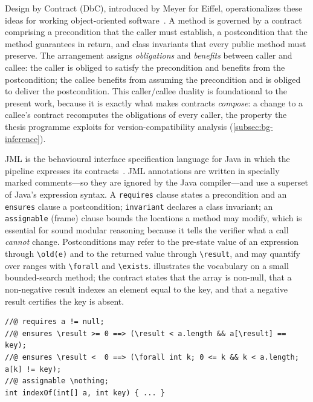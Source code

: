 Design by Contract (DbC), introduced by Meyer for Eiffel, operationalizes these ideas for working object-oriented software~\cite{meyer1992dbc,meyer1997oosc}. A method is governed by a contract comprising a precondition that the caller must establish, a postcondition that the method guarantees in return, and class invariants that every public method must preserve. The arrangement assigns \emph{obligations} and \emph{benefits} between caller and callee: the caller is obliged to satisfy the precondition and benefits from the postcondition; the callee benefits from assuming the precondition and is obliged to deliver the postcondition. This caller/callee duality is foundational to the present work, because it is exactly what makes contracts \emph{compose}: a change to a callee's contract recomputes the obligations of every caller, the property the thesis programme exploits for version-compatibility analysis (\cref{subsec:bg-inference}).

JML is the behavioural interface specification language for Java in which the pipeline expresses its contracts~\cite{leavens2006jml}. JML annotations are written in specially marked comments---so they are ignored by the Java compiler---and use a superset of Java's expression syntax. A \texttt{requires} clause states a precondition and an \texttt{ensures} clause a postcondition; \texttt{invariant} declares a class invariant; an \texttt{assignable} (frame) clause bounds the locations a method may modify, which is essential for sound modular reasoning because it tells the verifier what a call \emph{cannot} change. Postconditions may refer to the pre-state value of an expression through \verb|\old(e)| and to the returned value through \verb|\result|, and may quantify over ranges with \verb|\forall| and \verb|\exists|.  illustrates the vocabulary on a small bounded-search method; the contract states that the array is non-null, that a non-negative result indexes an element equal to the key, and that a negative result certifies the key is absent.

\begin{lstlisting}[caption={A JML method contract using the core clauses the pipeline manipulates.},label={lst:jml-example},captionpos=b]
//@ requires a != null;
//@ ensures \result >= 0 ==> (\result < a.length && a[\result] == key);
//@ ensures \result <  0 ==> (\forall int k; 0 <= k && k < a.length; a[k] != key);
//@ assignable \nothing;
int indexOf(int[] a, int key) { ... }
\end{lstlisting}

